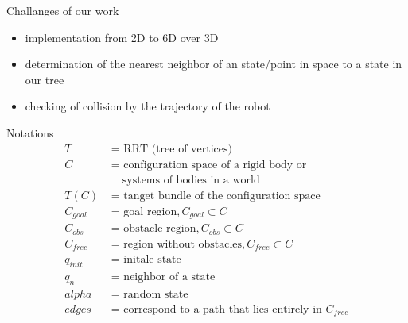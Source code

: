 \documentclass[%
  professionalfonts,%
  xcolor={%
    usenames,%
    dvipsnames,%
    svgnames,%
    table,%
    hyperref%
  }%
]{beamer}
\begin{document}
      \begin{frame}{Challanges of our work}
        \begin{itemize}
          \item implementation from 2D to 6D over 3D
          \item determination of the nearest neighbor of an state/point in space to a state in our tree
          \item checking of collision by the trajectory of the robot
        \end{itemize}
      \end{frame}
      
      \begin{frame}{Notations}
        \begin{align*}
        T        & \text{ = RRT (tree of vertices)}\\
        C        & \text{ = configuration space of a rigid body or}\\
                 & \text{ ~~ systems of bodies in a world}\\
        T(C)     & \text{ = tanget bundle of the configuration space}\\
        C_{goal} & \text{ = goal region},  C_{goal} \subset C\\
        C_{obs}  & \text{ = obstacle region},  C_{obs} \subset C\\
        C_{free} & \text{ = region without obstacles}, C_{free} \subset C\\
        q_{init} & \text{ = initale state}\\
        q_n      & \text{ = neighbor of a state}\\
        alpha    & \text{ = random state}\\
        edges    & \text{ = correspond to a path that lies entirely in } C_{free}\\
        \end{align*}
      \end{frame}
      
\end{document}
